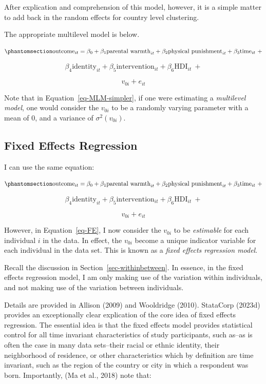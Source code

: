 \documentclass[
  letterpaper,
  DIV=11,
  numbers=noendperiod]{scrreprt}
\begin{document}
After explication and comprehension of this model, however, it is a
simple matter to add back in the random effects for country level
clustering.

The appropriate multilevel model is below.

\begin{equation}\phantomsection\label{eq-MLM-simpler}{\text{outcome}_{it} = \beta_0 + \beta_1 \text{parental warmth}_{it} + \beta_2 \text{physical punishment}_{it} + \beta_3 \text{time}_{it} \ + }\end{equation}

\[\beta_4 \text{identity}_{it} + \beta_5 \text{intervention}_{it} + \beta_6 \text{HDI}_{it} \ +\]

\[v_{0i} + e_{it}\]

Note that in Equation~\ref{eq-MLM-simpler}, if one were estimating a
\emph{multilevel model}, one would consider the \(v_{0i}\) to be a
randomly varying parameter with a mean of 0, and a variance of
\(\sigma^2(v_{0i})\).

\subsection{Fixed Effects Regression}\label{fixed-effects-regression}

I can use the same equation:

\begin{equation}\phantomsection\label{eq-FE}{\text{outcome}_{it} = \beta_0 + \beta_1 \text{parental warmth}_{it} + \beta_2 \text{physical punishment}_{it} + \beta_3 \text{time}_{it} \ + }\end{equation}

\[\beta_4 \text{identity}_{it} + \beta_5 \text{intervention}_{it} + \beta_6 \text{HDI}_{it} \ +\]

\[v_{0i} + e_{it}\]

However, in Equation~\ref{eq-FE}, I now consider the \(v_{0i}\) to be
\emph{estimable} for each individual \(i\) in the data. In effect, the
\(v_{0i}\) become a unique indicator variable for each individual in the
data set. This is known as a \emph{fixed effects regression model}.

Recall the discussion in Section~\ref{sec-withinbetween}. In essence, in
the fixed effects regression model, I am only making use of the
variation within individuals, and not making use of the variation
between individuals.

Details are provided in Allison (2009) and Wooldridge (2010). StataCorp
(2023d) provides an exceptionally clear explication of the core idea of
fixed effects regression. The essential idea is that the fixed effects
model provides statistical control for all time invariant
characteristics of study participants, such as--as is often the case in
many data sets--their racial or ethnic identity, their neighborhood of
residence, or other characteristics which by definition are time
invariant, such as the region of the country or city in which a
respondent was born. Importantly, (Ma et al., 2018) note that:
\end{document}
